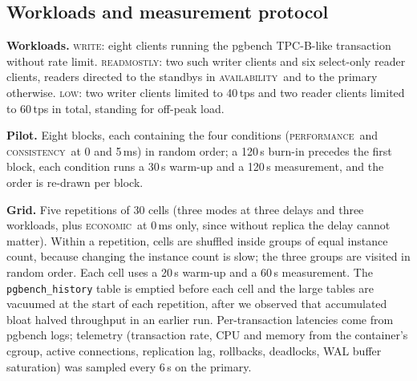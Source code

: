 \documentclass[smallextended]{svjour3}
\newcommand{\perf}{\textsc{performance}}
\newcommand{\cons}{\textsc{consistency}}
\newcommand{\avail}{\textsc{availability}}
\newcommand{\econ}{\textsc{economic}}
\begin{document}
\subsection{Workloads and measurement protocol}
\textbf{Workloads.} \textsc{write}: eight clients running the pgbench TPC-B-like transaction without rate limit. \textsc{readmostly}: two such writer clients and six select-only reader clients, readers directed to the standbys in \avail\ and to the primary otherwise. \textsc{low}: two writer clients limited to 40\,tps and two reader clients limited to 60\,tps in total, standing for off-peak load.

\textbf{Pilot.} Eight blocks, each containing the four conditions (\perf\ and \cons\ at 0 and 5\,ms) in random order; a 120\,s burn-in precedes the first block, each condition runs a 30\,s warm-up and a 120\,s measurement, and the order is re-drawn per block.

\textbf{Grid.} Five repetitions of 30 cells (three modes at three delays and three workloads, plus \econ\ at 0\,ms only, since without replica the delay cannot matter). Within a repetition, cells are shuffled inside groups of equal instance count, because changing the instance count is slow; the three groups are visited in random order. Each cell uses a 20\,s warm-up and a 60\,s measurement. The \texttt{pgbench\_history} table is emptied before each cell and the large tables are vacuumed at the start of each repetition, after we observed that accumulated bloat halved throughput in an earlier run. Per-transaction latencies come from pgbench logs; telemetry (transaction rate, CPU and memory from the container's cgroup, active connections, replication lag, rollbacks, deadlocks, WAL buffer saturation) was sampled every 6\,s on the primary.
\end{document}

